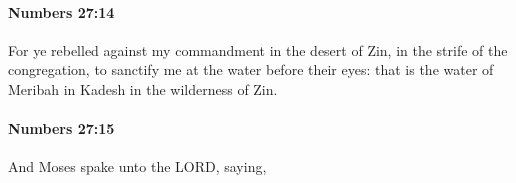 		\paragraph{Numbers 27:14} %
			\label{NUMBERS-27-14}

			For ye rebelled against my commandment in the desert of Zin, in the strife of the congregation, to sanctify me at the water before their eyes: that is the water of Meribah in Kadesh in the wilderness of Zin.


		\paragraph{Numbers 27:15} %
			\label{NUMBERS-27-15}

			And Moses spake unto the LORD, saying,


